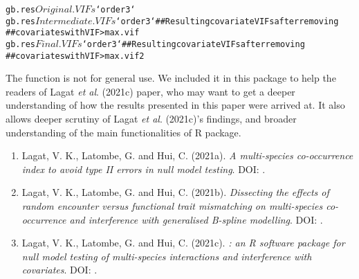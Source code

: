 \documentclass[a4paper]{book}
\begin{document}
\begin{Value}
\begin{itemize}
\begin{alltt}
 gb.res$Original.VIFs$`order 3`
 gb.res$Intermediate.VIFs$`order 3` ## Resulting covariate VIFs after removing
                                       ## covariates with VIF > max.vif
 gb.res$Final.VIFs$`order 3` ## Resulting covariate VIFs after removing
                                 ## covariates with VIF > max.vif2

\end{alltt}


\end{itemize}

\end{Value}
%
\begin{Note}\relax
The function  is not for general use. We included it in this package to help
the readers of Lagat \emph{et al}. (2021c) paper, who may want to get a deeper understanding of how the results
presented in this paper were arrived at. It also allows deeper scrutiny of Lagat \emph{et al}. (2021c)'s
findings, and broader understanding of the main functionalities of  R package.
\end{Note}
%
\begin{References}\relax
\begin{enumerate}

\item{} Lagat, V. K., Latombe, G. and Hui, C. (2021a). \emph{A multi-species co-occurrence
index to avoid type II errors in null model testing}. DOI: .

\item{} Lagat, V. K., Latombe, G. and Hui, C. (2021b). \emph{Dissecting the effects of random
encounter versus functional trait mismatching on multi-species co-occurrence and
interference with generalised B-spline modelling}. DOI: .

\item{} Lagat, V. K., Latombe, G. and Hui, C. (2021c). \emph{: an R software package
for null model testing of multi-species interactions and interference with
covariates}. DOI: .


\end{enumerate}

\end{References}
%
\begin{Examples}
\end{Examples}
\end{document}
